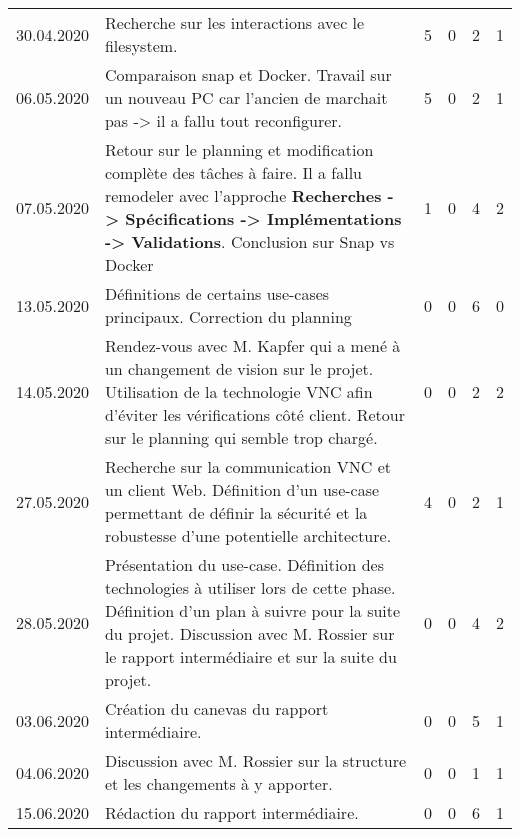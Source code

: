 \begin{landscape}
\begin{longtable}[c]{lp{10cm}rrrr}
	30.04.2020
	& Recherche sur les interactions avec le filesystem.
	& 5 %
	& 0 %
	& 2 %
	& 1\\ %
	
	06.05.2020
	& Comparaison snap et Docker. Travail sur un nouveau PC car l'ancien de marchait pas -> il a fallu tout reconfigurer.
	& 5 %
	& 0 %
	& 2 %
	& 1\\ %
	
	07.05.2020
	& Retour sur le planning et modification complète des tâches à faire. Il a fallu remodeler avec l'approche \textbf{Recherches -> Spécifications -> Implémentations -> Validations}. Conclusion sur Snap vs Docker
	& 1 %
	& 0 %
	& 4 %
	& 2\\ %
	
	13.05.2020
	& Définitions de certains use-cases principaux. Correction du planning
	& 0 %
	& 0 %
	& 6 %
	& 0\\ %
	
	14.05.2020
	& Rendez-vous avec M. Kapfer qui a mené à un changement de vision sur le projet. Utilisation de la technologie VNC afin d'éviter les vérifications côté client. Retour sur le planning qui semble trop chargé.
	& 0 %
	& 0 %
	& 2 %
	& 2\\ %
	
	27.05.2020
	& Recherche sur la communication VNC et un client Web. Définition d'un use-case permettant de définir la sécurité et la robustesse d'une potentielle architecture.
	& 4 %
	& 0 %
	& 2 %
	& 1\\ %
	
	28.05.2020
	& Présentation du use-case. Définition des technologies à utiliser lors de cette phase. Définition d'un plan à suivre pour la suite du projet. Discussion avec M. Rossier sur le rapport intermédiaire et sur la suite du projet.
	& 0 %
	& 0 %
	& 4 %
	& 2\\ %
	
	03.06.2020
	& Création du canevas du rapport intermédiaire.
	& 0 %
	& 0 %
	& 5 %
	& 1\\ %
	
	04.06.2020
	& Discussion avec M. Rossier sur la structure et les changements à y apporter.
	& 0 %
	& 0 %
	& 1 %
	& 1\\ %
	
	15.06.2020
	& Rédaction du rapport intermédiaire.
	& 0 %
	& 0 %
	& 6 %
	& 1\\ %
	

\end{longtable}
\end{landscape}
